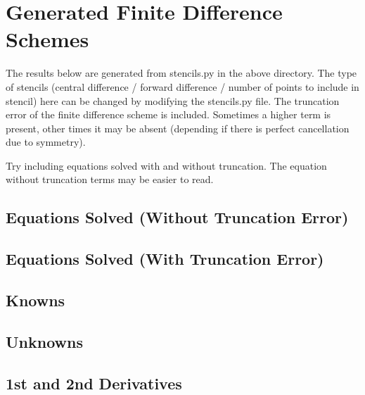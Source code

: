 \documentclass[landscape]{article}
\begin{document}
\section{Generated Finite Difference Schemes}
The results below are generated from stencils.py in the above directory. The type of stencils (central difference / forward difference / number of points to include in stencil) here can be changed by modifying the stencils.py file. The truncation error of the finite difference scheme is included. Sometimes a higher term is present, other times it may be absent (depending if there is perfect cancellation due to symmetry).

Try including equations solved with and without truncation. The equation without truncation terms may be easier to read.

\subsection{Equations Solved (Without Truncation Error)}

\subsection{Equations Solved (With Truncation Error)}

\subsection{Knowns}

\subsection{Unknowns}



% 
% 
% 
% 

\subsection{1st and 2nd Derivatives}

% 

% 
\end{document}
